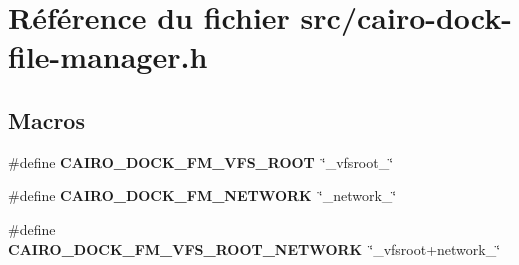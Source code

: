 \section{Référence du fichier src/cairo-dock-file-manager.h}
\label{cairo-dock-file-manager_8h}
\subsection*{Macros}
\begin{CompactItemize}
\item 
\#define {\bf CAIRO\_\-DOCK\_\-FM\_\-VFS\_\-ROOT}~\char`\"{}\_\-vfsroot\_\-\char`\"{}
\item 
\#define {\bf CAIRO\_\-DOCK\_\-FM\_\-NETWORK}~\char`\"{}\_\-network\_\-\char`\"{}
\item 
\#define {\bf CAIRO\_\-DOCK\_\-FM\_\-VFS\_\-ROOT\_\-NETWORK}~\char`\"{}\_\-vfsroot+network\_\-\char`\"{}
\end{CompactItemize}
